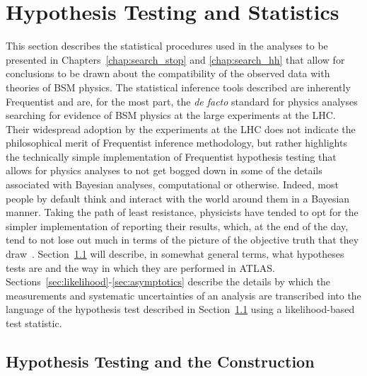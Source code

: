 \section{Hypothesis Testing and Statistics}
\label{sec:stat_hypo}

This section describes the statistical procedures used in the analyses to be
presented in Chapters~\ref{chap:search_stop} and \ref{chap:search_hh} that allow
for conclusions to be drawn about the compatibility of the observed data with theories of
BSM physics.
The statistical inference tools described are inherently Frequentist and
are, for the most part, the \textit{de facto} standard for physics analyses searching for evidence of BSM physics
at the large experiments at the LHC.
Their widespread adoption by the experiments at the LHC does not indicate the
philosophical merit of Frequentist inference methodology, but rather highlights the technically simple implementation
of Frequentist hypothesis testing that allows for physics analyses to not get
bogged down in some of the details associated with Bayesian analyses, computational
or otherwise.
Indeed, most people by default think and interact with the world around them
in a Bayesian manner.
Taking the path of least resistance, physicists have tended to opt for the simpler
implementation of reporting their results, which, at the end of the day,
tend to not lose out much in terms of the picture of the objective truth that they draw~\cite{CousinsBayes}.
Section~\ref{sec:hypo_test} will describe, in somewhat general terms, what
hypotheses tests are and the way in which they are performed in ATLAS.
Sections~\ref{sec:likelihood}-\ref{sec:asymptotics} describe the details by which the measurements and systematic
uncertainties of
an analysis are transcribed into the language of the hypothesis test described
in Section~\ref{sec:hypo_test} using a likelihood-based test statistic.


%
%

\subsection{Hypothesis Testing and the \cls Construction}
\label{sec:hypo_test}


